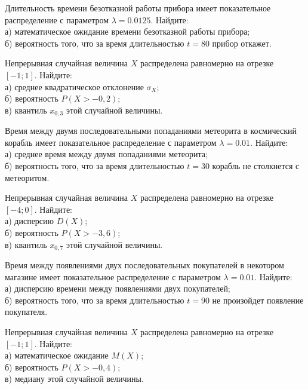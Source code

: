 \vfill

\z Длительность времени безотказной работы прибора имеет показательное распределение с параметром $\lambda = 0.0125$. Найдите: \\ \quad а) математическое ожидание времени безотказной работы прибора; \\ \quad б) вероятность того, что за время длительностью $t = 80$ прибор  откажет.
 

\vfill

\newpage\setcounter{zad}{0}

\z Непрерывная случайная величина $X$ распределена равномерно на отрезке $[-1; 1]$. Найдите: \\ \quad а) среднее квадратическое отклонение $\sigma_X$; \\ \quad б) вероятность $P(X>-0{,}2)$; \\ \quad в) квантиль $x_{0{,}3}$ этой случайной величины.


\vfill

\z Время между двумя последовательными попаданиями метеорита в космический корабль имеет показательное распределение с параметром $\lambda = 0.01$. Найдите: \\ \quad а) среднее время между двумя попаданиями метеорита; \\ \quad б) вероятность того, что за время длительностью $t = 30$ корабль не столкнется с метеоритом.
 

\vfill

\newpage\setcounter{zad}{0}

\z Непрерывная случайная величина $X$ распределена равномерно на отрезке $[-4; 0]$. Найдите: \\ \quad а) дисперсию $D(X)$; \\ \quad б) вероятность $P(X>-3{,}6)$; \\ \quad в) квантиль $x_{0{,}7}$ этой случайной величины.


\vfill

\z Время между появлениями двух последовательных покупателей в некотором магазине имеет показательное распределение с параметром $\lambda = 0.01$. Найдите: \\ \quad а) дисперсию времени между появлениями двух покупателей; \\ \quad б) вероятность того, что за время длительностью $t = 90$ не произойдет появление покупателя.
 

\vfill

\newpage\setcounter{zad}{0}

\z Непрерывная случайная величина $X$ распределена равномерно на отрезке $[-1; 1]$. Найдите: \\ \quad а) математическое ожидание $M(X)$; \\ \quad б) вероятность $P(X>-0{,}4)$; \\ \quad в) медиану этой случайной величины.


